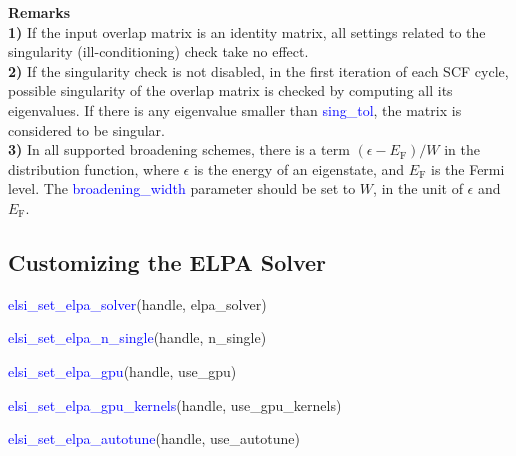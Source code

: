 \documentclass{report}
\begin{document}
\newpage
\textbf{Remarks}\\

\textbf{1)} If the input overlap matrix is an identity matrix, all settings related to the singularity (ill-conditioning) check take no effect.\\

\textbf{2)} If the singularity check is not disabled, in the first iteration of each SCF cycle, possible singularity of the overlap matrix is checked by computing all its eigenvalues.  If there is any eigenvalue smaller than \textcolor{blue}{sing\_tol}, the matrix is considered to be singular.\\

\textbf{3)} In all supported broadening schemes, there is a term $(\epsilon - E_\text{F})/W$ in the distribution function, where $\epsilon$ is the energy of an eigenstate, and $E_\text{F}$ is the Fermi level.  The \textcolor{blue}{broadening\_width} parameter should be set to $W$, in the unit of $\epsilon$ and $E_\text{F}$.\\

\subsection{Customizing the ELPA Solver}
\label{subsec:setter_elpa}
\begin{labeling}{\hspace{6cm}}
\item [\hspace{0.3cm} \textcolor{blue}{elsi\_set\_elpa\_solver}(handle, elpa\_solver)]
\item [\hspace{0.3cm} \textcolor{blue}{elsi\_set\_elpa\_n\_single}(handle, n\_single)]
\item [\hspace{0.3cm} \textcolor{blue}{elsi\_set\_elpa\_gpu}(handle, use\_gpu)]
\item [\hspace{0.3cm} \textcolor{blue}{elsi\_set\_elpa\_gpu\_kernels}(handle, use\_gpu\_kernels)]
\item [\hspace{0.3cm} \textcolor{blue}{elsi\_set\_elpa\_autotune}(handle, use\_autotune)]
\end{labeling}
\end{document}
